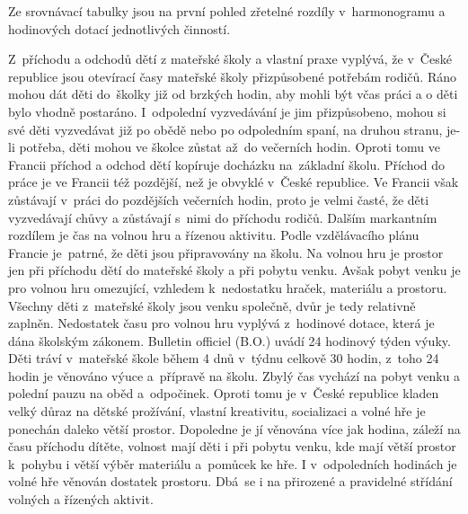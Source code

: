 		Ze srovnávací tabulky jsou na první pohled zřetelné rozdíly v harmonogramu a hodinových dotací jednotlivých činností.

 		Z příchodu a odchodů dětí z mateřské školy a vlastní praxe vyplývá, že v České republice jsou otevírací časy mateřské školy přizpůsobené potřebám rodičů. Ráno mohou dát děti do školky již od brzkých hodin, aby mohli být včas práci a o děti bylo vhodně postaráno. I odpolední vyzvedávání je jim přizpůsobeno, mohou si své děti vyzvedávat již po obědě nebo po odpoledním spaní, na druhou stranu, je-li potřeba, děti mohou ve školce zůstat až do večerních hodin. Oproti tomu ve Francii příchod a odchod dětí kopíruje docházku na základní školu. Příchod do práce je ve Francii též pozdější, než je obvyklé v České republice. Ve Francii však zůstávají v práci do pozdějších večerních hodin, proto je velmi časté, že děti vyzvedávají chůvy a zůstávají s nimi do příchodu rodičů. Dalším markantním rozdílem je čas na volnou hru a řízenou aktivitu. Podle vzdělávacího plánu Francie je patrné, že děti jsou připravovány na školu. Na volnou hru je prostor jen při příchodu dětí do mateřské školy a při pobytu venku. Avšak pobyt venku je pro volnou hru omezující, vzhledem k nedostatku hraček, materiálu a prostoru. Všechny děti z mateřské školy jsou venku společně, dvůr je tedy relativně zaplněn. Nedostatek času pro volnou hru vyplývá z hodinové dotace, která je dána školským zákonem. Bulletin officiel (B.O.) uvádí 24 hodinový týden výuky. Děti tráví v mateřské škole během 4 dnů v týdnu celkově 30 hodin, z toho 24 hodin je věnováno výuce a přípravě na školu. Zbylý čas vychází na pobyt venku a polední pauzu na oběd a odpočinek. Oproti tomu je v České republice kladen velký důraz na dětské prožívání, vlastní kreativitu, socializaci a volné hře je ponechán daleko větší prostor. Dopoledne je jí věnována více jak hodina, záleží na času příchodu dítěte, volnost mají děti i při pobytu venku, kde mají větší prostor k pohybu i větší výběr materiálu a pomůcek ke hře. I v odpoledních hodinách je volné hře věnován dostatek prostoru. Dbá se i na přirozené a pravidelné střídání volných a řízených aktivit.

